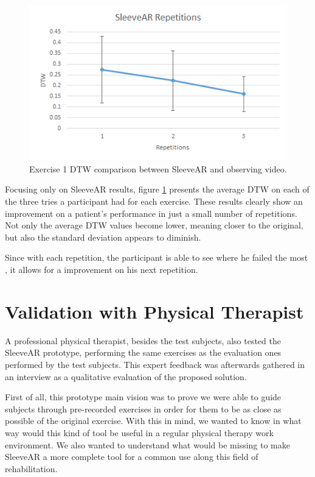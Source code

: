 \begin{figure}[t!]
    \centering
    \includegraphics{imgs/results/dtw_repetitions.png}
    \caption{Exercise 1 DTW comparison between SleeveAR and observing video.}
    \label{fig:dtw_repetitions}
\end{figure}

Focusing only on SleeveAR results, figure \ref{fig:dtw_repetitions} presents the average DTW on each of the three tries a participant had for each exercise. 
These results clearly show an improvement on a patient's performance in just a small number of repetitions. 
Not only the average DTW values become lower, meaning closer to the original, but also the standard deviation appears to diminish. 

Since with each repetition, the participant is able to see where he failed the most , 
it allows for a improvement on his next repetition.


\section{Validation with Physical Therapist}

A professional physical therapist, besides the test subjects, also tested the SleeveAR prototype, performing the same exercises as the evaluation ones performed by the test subjects. This expert feedback was afterwards gathered in an interview as a qualitative evaluation of the proposed solution.

First of all, this prototype main vision was to prove we were able to guide subjects through pre-recorded exercises in order for them to be as close as possible of the original exercise. With this in mind, we wanted to know in what way would this kind of tool be useful in a regular physical therapy work environment. We also wanted to understand what would be missing to make SleeveAR a more complete tool for a common use along this field of rehabilitation.

